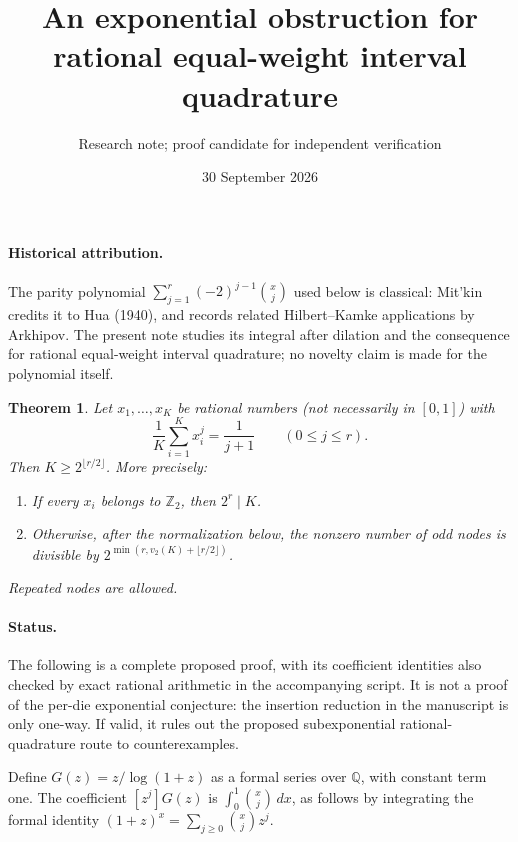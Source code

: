 \documentclass[11pt]{article}
\newtheorem{theorem}{Theorem}
\newcommand{\vii}{v_2}
\newcommand{\Zii}{\mathbb Z_2}
\begin{document}
\title{An exponential obstruction for rational equal-weight interval quadrature}
\author{Research note; proof candidate for independent verification}
\date{30 September 2026}
\maketitle

\paragraph{Historical attribution.}
The parity polynomial $\sum_{j=1}^r(-2)^{j-1}\binom{x}{j}$ used below is
classical: Mit'kin \cite[Lemma~7 and following remark]{mitkin} credits it
to Hua (1940), and records related Hilbert--Kamke applications by Arkhipov.
The present note studies its integral after dilation and the consequence
for rational equal-weight interval quadrature; no novelty claim is made
for the polynomial itself.


\begin{theorem}\label{thm:main}
Let $x_1,\ldots,x_K$ be rational numbers (not necessarily in $[0,1]$)
with
\[
 \frac1K\sum_{i=1}^K x_i^j=\frac1{j+1}\qquad(0\leq j\leq r).
\]
Then $K\geq 2^{\lfloor r/2\rfloor}$. More precisely:
\begin{enumerate}
\item If every $x_i$ belongs to $\Zii$, then $2^r\mid K$.
\item Otherwise, after the normalization below, the nonzero number of odd nodes is divisible by $2^{\min(r,\vii(K)+\lfloor r/2\rfloor)}$.
\end{enumerate}
Repeated nodes are allowed.
\end{theorem}

\paragraph{Status.}
The following is a complete proposed proof, with its coefficient identities
also checked by exact rational arithmetic in the accompanying script.
It is not a proof of the per-die exponential conjecture: the insertion
reduction in the manuscript is only one-way. If valid, it rules out the
proposed subexponential rational-quadrature route to counterexamples.

Define $G(z)=z/\log(1+z)$ as a formal series over $\mathbb Q$, with constant
term one. The coefficient $[z^j]G(z)$ is
$\int_0^1\binom{x}{j}\,dx$, as follows by integrating the formal identity
$(1+z)^x=\sum_{j\geq0}\binom{x}{j}z^j$.
\end{document}
